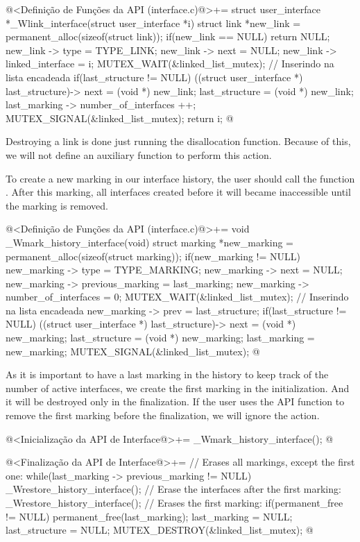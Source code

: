 \iniciocodigo
@<Definição de Funções da API (interface.c)@>+=
struct user_interface *_Wlink_interface(struct user_interface *i){
  struct link *new_link = permanent_alloc(sizeof(struct link));
  if(new_link == NULL)
    return NULL;
  new_link -> type = TYPE_LINK;
  new_link -> next = NULL;
  new_link -> linked_interface = i;
  MUTEX_WAIT(&linked_list_mutex); // Inserindo na lista encadeada
  if(last_structure != NULL)
    ((struct user_interface *) last_structure)-> next = (void *) new_link;
  last_structure = (void *) new_link;
  last_marking -> number_of_interfaces ++;
  MUTEX_SIGNAL(&linked_list_mutex);
  return i;
}
@
\fimcodigo

Destroying a link is done just running the disallocation
function. Because of this, we will not define an auxiliary function to
perform this action.


To create a new marking in our interface history, the user should call
the function . After this
marking, all interfaces created before it will became inaccessible
until the marking is removed.

\iniciocodigo
@<Definição de Funções da API (interface.c)@>+=
void _Wmark_history_interface(void){
  struct marking *new_marking = permanent_alloc(sizeof(struct marking));
  if(new_marking != NULL){
    new_marking -> type = TYPE_MARKING;
    new_marking -> next = NULL;
    new_marking -> previous_marking = last_marking;
    new_marking -> number_of_interfaces = 0;
    MUTEX_WAIT(&linked_list_mutex); // Inserindo na lista encadeada
    new_marking -> prev = last_structure;
    if(last_structure != NULL)
      ((struct user_interface *) last_structure)-> next = (void *) new_marking;
    last_structure = (void *) new_marking;
    last_marking = new_marking;
    MUTEX_SIGNAL(&linked_list_mutex);
  }
}
@
\fimcodigo

As it is important to have a last marking in the history to keep track
of the number of active interfaces, we create the first marking in the
initialization. And it will be destroyed only in the finalization. If
the user uses the API function to remove the first marking before the
finalization, we will ignore the action.

\iniciocodigo
@<Inicialização da API de Interface@>+=
_Wmark_history_interface();
@
\fimcodigo

\iniciocodigo
@<Finalização da API de Interface@>+=
// Erases all markings, except the first one:
while(last_marking -> previous_marking != NULL){
  _Wrestore_history_interface();
}
// Erase the interfaces after the first marking:
_Wrestore_history_interface();
// Erases the first marking:
if(permanent_free != NULL)
  permanent_free(last_marking);
last_marking = NULL;
last_structure = NULL;
MUTEX_DESTROY(&linked_list_mutex);
@
\fimcodigo

